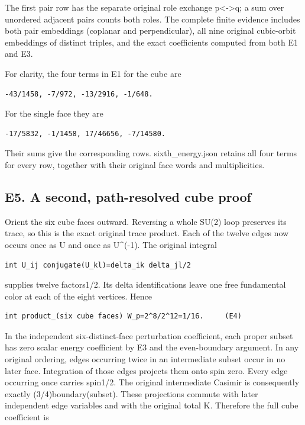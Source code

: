\documentclass[11pt,a4paper]{article}
\renewcommand{\[}{\begingroup\small\originaldisplaystart}
\renewcommand{\]}{\originaldisplayend\endgroup}
\begin{document}
The first pair row has the separate original role exchange
p\textless-\textgreater q; a sum over unordered adjacent pairs counts
both roles. The complete finite evidence includes both pair embeddings
(coplanar and perpendicular), all nine original cubic-orbit embeddings
of distinct triples, and the exact coefficients computed from both E1
and E3.

For clarity, the four terms in E1 for the cube are

\begin{verbatim}
-43/1458, -7/972, -13/2916, -1/648.
\end{verbatim}

For the single face they are

\begin{verbatim}
-17/5832, -1/1458, 17/46656, -7/14580.
\end{verbatim}

Their sums give the corresponding rows.
{\ttfamily s\allowbreak{}i\allowbreak{}x\allowbreak{}t\allowbreak{}h\allowbreak{}\_\allowbreak{}e\allowbreak{}n\allowbreak{}e\allowbreak{}r\allowbreak{}g\allowbreak{}y\allowbreak{}.\allowbreak{}j\allowbreak{}s\allowbreak{}o\allowbreak{}n\allowbreak{}}
retains all four terms for every row, together with their original face
words and multiplicities.

\subsection{E5. A second, path-resolved cube
proof}\label{e5.-a-second-path-resolved-cube-proof}

Orient the six cube faces outward. Reversing a whole SU(2) loop
preserves its trace, so this is the exact original trace product. Each
of the twelve edges now occurs once as U and once as U\^{}(-1). The
original integral

\begin{verbatim}
int U_ij conjugate(U_kl)=delta_ik delta_jl/2
\end{verbatim}

supplies twelve factors1/2. Its delta identifications leave one free
fundamental color at each of the eight vertices. Hence

\begin{verbatim}
int product_(six cube faces) W_p=2^8/2^12=1/16.     (E4)
\end{verbatim}

In the independent six-distinct-face perturbation coefficient, each
proper subset has zero scalar energy coefficient by E3 and the
even-boundary argument. In any original ordering, edges occurring twice
in an intermediate subset occur in no later face. Integration of those
edges projects them onto spin zero. Every edge occurring once carries
spin1/2. The original intermediate Casimir is consequently exactly
(3/4)\textbar boundary(subset)\textbar. These projections commute with
later independent edge variables and with the original total K.
Therefore the full cube coefficient is
\end{document}
